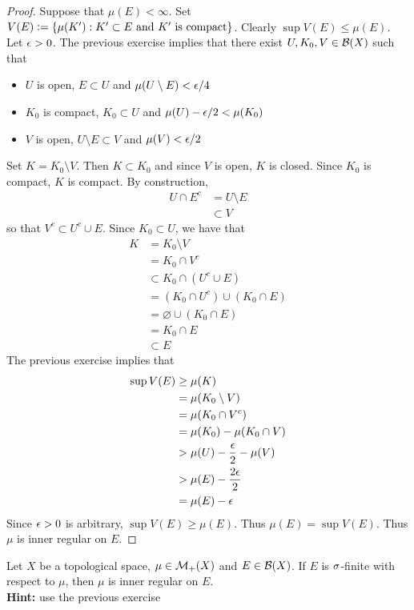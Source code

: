 \documentclass{book}
\begin{document}
	\begin{proof}
		Suppose that $\mu(E) < \infty$. Set $ V(E) \vcentcolon= \{\mu(K'): K' \subset E \text{ and $K'$ is compact} \}$. Clearly $\sup V(E) \leq \mu(E)$. Let $\epsilon > 0$. The previous exercise implies that there exist $U,K_0,V \in \mathcal{B}(X)$ such that 
		\begin{itemize}
			\item $U$ is open, $E \subset U$ and $\mu(U \setminus E) < \epsilon/4$
			\item  $K_0$ is compact, $K_0 \subset U$ and $\mu(U) - \epsilon/2 < \mu(K_0)$
			\item $V$ is open, $U \setminus E \subset V$ and $\mu(V) < \epsilon/2$
		\end{itemize}
		Set $K = K_0 \setminus V$. Then $K \subset K_0$ and since $V$ is open, $K$ is closed. Since $K_0$ is compact, $K$ is compact. By construction, 
		\begin{align*}
			U \cap E^c 
			& = U \setminus E \\
			& \subset V
		\end{align*} 
		so that $V^c \subset U^c \cup E$. Since $K_0 \subset U$, we have that 
		\begin{align*}
			K
			& = K_0 \setminus V \\
			& = K_0 \cap V^c \\
			& \subset K_0 \cap (U^c \cup E) \\
			& = (K_0 \cap U^c) \cup (K_0 \cap E) \\
			& = \varnothing \cup (K_0 \cap E) \\
			& = K_0 \cap E \\
			& \subset E
		\end{align*}
		The previous exercise implies that 
		\begin{align*}
			\sup V(E)
			& \geq \mu(K) \\
			& = \mu(K_0 \setminus V) \\
			& = \mu(K_0 \cap V^c) \\
			& = \mu(K_0) - \mu(K_0 \cap V) \\
			& > \mu(U) - \frac{\epsilon}{2} - \mu(V) \\
			& > \mu(E) - \frac{2\epsilon}{2} \\
			& = \mu(E) - \epsilon 
		\end{align*}
		Since $\epsilon >0$ is arbitrary, $\sup V(E) \geq \mu(E)$. Thus $\mu(E) = \sup V(E)$. Thus $\mu$ is inner regular on $E$. 
	\end{proof}		
	
	\begin{ex}  
		Let $X$ be a topological space, $\mu \in \mathcal{M}_+(X)$ and $E \in \mathcal{B}(X)$. If $E$ is $\sigma$-finite with respect to $\mu$, then $\mu$ is inner regular on $E$. \\
		\textbf{Hint:} use the previous exercise
	\end{ex}
	
\end{document}
